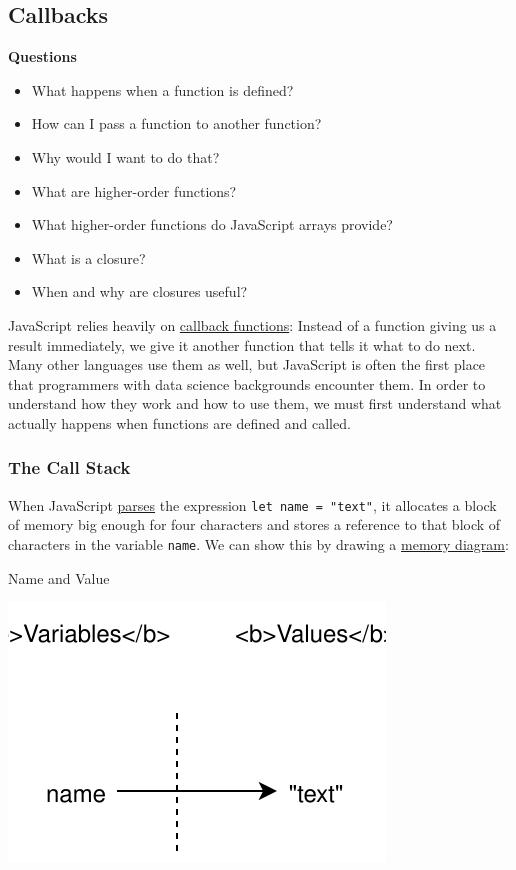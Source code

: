 \hypertarget{s:callbacks}{\subsection{Callbacks}\label{s:callbacks}}

\textbf{Questions}

\begin{itemize}
\tightlist
\item
  What happens when a function is defined?
\item
  How can I pass a function to another function?
\item
  Why would I want to do that?
\item
  What are higher-order functions?
\item
  What higher-order functions do JavaScript arrays provide?
\item
  What is a closure?
\item
  When and why are closures useful?
\end{itemize}

JavaScript relies heavily on
\protect\hyperlink{g:callback-function}{callback functions}: Instead of
a function giving us a result immediately, we give it another function
that tells it what to do next. Many other languages use them as well,
but JavaScript is often the first place that programmers with data
science backgrounds encounter them. In order to understand how they work
and how to use them, we must first understand what actually happens when
functions are defined and called.

\subsubsection{The Call Stack}\label{s:callbacks-callstack}

When JavaScript \protect\hyperlink{g:parse}{parses} the expression
\texttt{let\ name\ =\ "text"}, it allocates a block of memory big enough
for four characters and stores a reference to that block of characters
in the variable \texttt{name}. We can show this by drawing a
\protect\hyperlink{g:memory-diagram}{memory diagram}:

Name and Value

\includegraphics{../../files/callbacks-name-value.svg}

